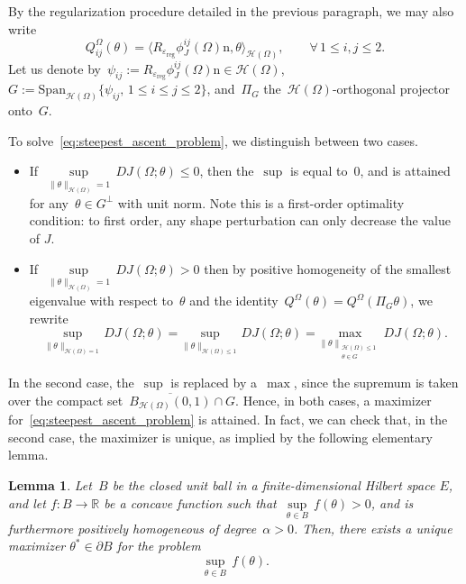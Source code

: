 \documentclass[a4]{article}
\newcommand{\R}{\mathbb{R}}
\newcommand{\n}{\mathrm{n}}
\newcommand{\reg}{\mathrm{reg}}
\newcommand{\1}{\mathbbm 1}
\newtheorem{lemma}{Lemma}
\begin{document}
By the regularization procedure detailed in the previous paragraph, we may also write
\begin{equation}
    \label{eq:perturbation_matrix_J_volume_form}
    Q_{ij}^{\Omega}(\theta) = \langle R_{\varepsilon_\reg}\phi^{ij}_{J}(\Omega)\n,\theta\rangle_{\mathcal{H}(\Omega)},\qquad \forall\,1\leq i,j\leq 2.
\end{equation}
Let us denote by~$\psi_{ij}:= R_{\varepsilon_\reg}\phi^{ij}_{J}(\Omega)\n\in \mathcal H(\Omega)$,~$G:=\mathrm{Span}_{\mathcal H(\Omega)}\{\psi_{ij},\,1\leq i\leq j\leq 2\}$, and~$\Pi_G$ the~$\mathcal H(\Omega)$-orthogonal projector onto~$G$.

To solve~\eqref{eq:steepest_ascent_problem}, we distinguish between two cases.
\begin{itemize}
    \item{If~$\underset{\|\theta\|_{\mathcal H(\Omega)}=1}{\sup}\, DJ(\Omega;\theta)\leq 0$, then the~$\sup$ is equal to~$0$, and is attained for any~$\theta\in G^\perp$ with unit norm. Note this is a first-order optimality condition: to first order, any shape perturbation can only decrease the value of $J$.}
    \item{If~$\underset{\|\theta\|_{\mathcal H(\Omega)}=1}{\sup}\, DJ(\Omega;\theta)>0$ then by positive homogeneity of the smallest eigenvalue with respect to~$\theta$ and the identity~$Q^\Omega(\theta)=Q^\Omega(\Pi_G\theta)$, we rewrite 
    \begin{equation}
    \underset{\|\theta\|_{\mathcal H(\Omega)=1}}{\mathrm{sup}}\,DJ(\Omega;\theta) = \underset{\|\theta\|_{\mathcal H(\Omega)\leq 1}}{\mathrm{sup}}\,DJ(\Omega;\theta) = \underset{\|\theta\|_{\substack{\mathcal H(\Omega)\leq 1\\\theta \in G}}}{\mathrm{max}}\,DJ(\Omega;\theta).
    \end{equation}}
\end{itemize}
In the second case, the~$\sup$ is replaced by a~$\max$, since the supremum is taken over the compact set~$\overline{B_{\mathcal H(\Omega)}(0,1)}\cap G$. Hence, in both cases, a maximizer for~\eqref{eq:steepest_ascent_problem} is attained.
In fact, we can check that, in the second case, the maximizer is unique, as implied by the following elementary lemma.
\begin{lemma}
    \label{lemma:unique_maximizer}
    Let~$B$ be the closed unit ball in a finite-dimensional Hilbert space $E$, and let $f:B\to\R$ be a concave function such that~$\underset{\theta\in B}{\sup}\, f(\theta)>0$, and is furthermore positively homogeneous of degree~$\alpha>0$. Then, there exists a unique maximizer $\theta^*\in \partial B$ for the problem
    \begin{equation}
        \underset{\theta\in B}{\sup}\,f(\theta).
    \end{equation}
\end{lemma}
\end{document}
